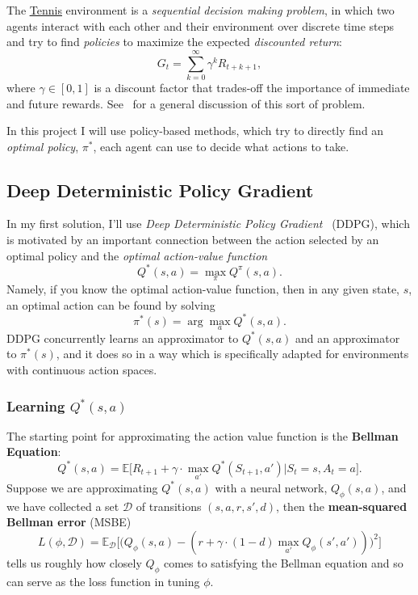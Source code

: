 \documentclass[sigchi]{acmart}
\begin{document}
The 
\href{https://github.com/Unity-Technologies/ml-agents/blob/master/docs/Learning-Environment-Examples.md#tennis}{\underline{Tennis}}
environment is a {\em sequential decision making problem}, in which two agents interact with each other and their environment over discrete time
steps and try to find {\em policies} to maximize the expected {\em discounted return}:
$$G_t = \sum_{k=0}^{\infty}\gamma^kR_{t+k+1},$$
where $\gamma\in[0,1]$  is a discount factor that trades-off the importance of immediate and future rewards.
See~\cite{DBLP:books/lib/SuttonB98} for a general discussion of this sort of problem. 

In this project I will use policy-based methods, which try to directly  find an {\em optimal policy}, $\pi^*$, each agent can use to decide what actions to take. 

\subsection{Deep Deterministic Policy Gradient}

In my first solution, I'll use 
 {\em Deep Deterministic Policy Gradient}~\cite{Silver:2014:DPG:3044805.3044850} (DDPG),
which is motivated by an important connection between the action selected by an optimal policy and the {\em optimal action-value function} 
	$$Q^*(s, a) =  \max_{\pi}Q^{\pi}(s,a).$$
Namely, if you know the optimal action-value function, then in any given state, $s$, an optimal action can be found by solving
	 $$\pi^*(s) = \arg\max_a Q^*(s,a).$$
 DDPG concurrently learns an approximator to $Q^*(s,a)$ and an approximator to $\pi^*(s)$, and it does so in a way which is specifically adapted for environments with continuous action spaces. 

\subsubsection{Learning $Q^*(s,a)$}

The starting point for approximating the action value function is the \textbf{Bellman Equation}:
$$Q^{*}(s,a) = \mathbb{E}\big[R_{t+1}+\gamma\cdot \max_{a'}Q^{*}(S_{t+1},a')| S_t = s, A_t=a\big].$$
Suppose we are approximating $Q^*(s, a)$ with a neural network, $Q_\phi(s,a)$, and we have collected a set $\mathcal{D}$ of
transitions $(s, a, r, s', d)$, then the \textbf{mean-squared Bellman error} (MSBE)
		$$L(\phi, \mathcal{D}) = \mathbb{E}_{\mathcal{D}}\big[\big(Q_\phi(s,a)-(r+\gamma\cdot(1-d)\max_{a'}Q_\phi(s',a'))\big)^2\big]$$
tells us roughly how closely $Q_{\phi}$ comes to satisfying the Bellman equation and so can serve as the loss function in tuning $\phi$.
\end{document}
